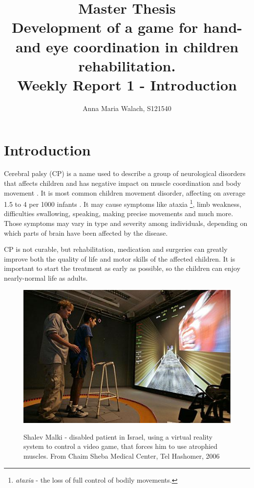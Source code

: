 \documentclass[10pt,a4paper]{article}
\title{{Master Thesis\\[0.5em]}
       {\bf \huge Development of a game for hand- and eye coordination in children rehabilitation.\\[0.5em]}
       {\bf Weekly Report 1 - Introduction }}
\author{Anna Maria Walach, S121540}
\begin{document}
\maketitle

\section*{Introduction }
Cerebral palsy (CP) is a name used to describe a group of neurological disorders that affects children and has negative impact on muscle coordination and body movement \cite{main_site}. It is most common children movement disorder, affecting on average 1.5 to 4 per 1000 infants \cite{stats}. It may cause symptoms like ataxia \footnote{\textit{ataxia} - the loss of full control of bodily movements.}, limb weakness, difficulties swallowing, speaking, making precise movements and much more. Those symptoms may vary in type and severity among individuals, depending on which parts of brain have been affected by the disease. 

CP is not curable, but rehabilitation, medication and surgeries can greatly improve both the quality of life and motor skills of the affected children. It is important to start the treatment as early as possible, so the children can enjoy nearly-normal life as adults.

\begin{figure}
\centering
\includegraphics[scale=0.8]{../images/rehab_example.JPG} 
\label{img:example}
\caption{Shalev Malki - disabled patient in Israel, using a virtual reality system to control a video game, that forces him to use atrophied muscles. From Chaim Sheba Medical Center, Tel Hashomer, 2006}
\end{figure}
\end{document}
